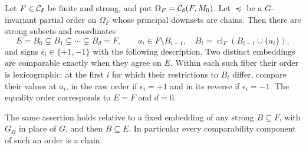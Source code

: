 \begin{theorem}
\label{G:alltreeorders}
Let $F\in\mathcal C_\delta$ be finite and strong, and put
$\Omega_F=\mathcal C_\delta(F,M_0)$. Let $\preceq$ be a $G$-invariant
partial order on $\Omega_F$ whose principal downsets are chains.
Then there are strong subsets and coordinates
\[
 E=B_0\subsetneq B_1\subsetneq\cdots\subsetneq B_d=F,
 \qquad a_i\in F\setminus B_{i-1},\quad
 B_i=\operatorname{cl}_F(B_{i-1}\cup\{a_i\}),
\]
and signs $\epsilon_i\in\{+1,-1\}$ with the following description.
Two distinct embeddings are comparable exactly when they agree
on $E$. Within each such fiber their order is lexicographic:
at the first $i$ for which their restrictions to $B_i$ differ,
compare their values at $a_i$, in the raw order if
$\epsilon_i=+1$ and in its reverse if $\epsilon_i=-1$.
The equality order corresponds to $E=F$ and $d=0$.

The same assertion holds relative to a fixed embedding of any
strong $B\subseteq F$, with $G_B$ in place of $G$, and then
$B\subseteq E$. In particular every comparability component
of such an order is a chain.
\end{theorem}
